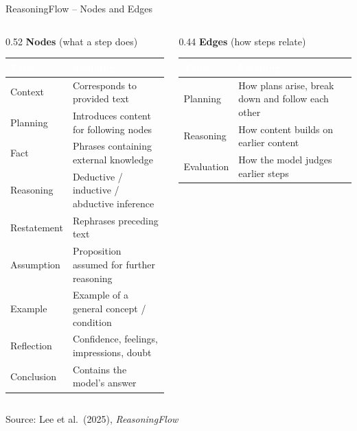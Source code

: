 \documentclass[aspectratio=169, 10pt]{beamer}
\newcommand{\hcell}[1]{\textcolor{white}{\textbf{#1}}}  %
\begin{document}
\begin{frame}{ReasoningFlow -- Nodes and Edges}
\begin{columns}[T]

\begin{column}{0.52\textwidth}
\textbf{Nodes} {\footnotesize (what a step does)}\\[0.3em]
\renewcommand{\arraystretch}{1.1}
\footnotesize
\setlength{\tabcolsep}{4pt}
\begin{tabular}{p{} p{}}
\toprule
\rowcolor{lmugreen}
\hcell{Type} & \hcell{Meaning} \\
\midrule
Context     & Corresponds to provided text \\
\rowcolor{lmulight!60}
Planning    & Introduces content for following nodes \\
Fact        & Phrases containing external knowledge \\
\rowcolor{lmulight!60}
Reasoning   & Deductive / inductive / abductive inference \\
Restatement & Rephrases preceding text \\
\rowcolor{lmulight!60}
Assumption  & Proposition assumed for further reasoning \\
Example     & Example of a general concept / condition \\
\rowcolor{lmulight!60}
Reflection  & Confidence, feelings, impressions, doubt \\
Conclusion  & Contains the model's answer \\
\bottomrule
\end{tabular}
\end{column}

\begin{column}{0.44\textwidth}
\textbf{Edges} {\footnotesize (how steps relate)}\\[0.3em]
\renewcommand{\arraystretch}{1.1}
\footnotesize
\setlength{\tabcolsep}{4pt}
\begin{tabular}{p{} p{}}
\toprule
\rowcolor{lmugreen}
\hcell{Type} & \hcell{Meaning} \\
\midrule
Planning   & How plans arise, break down and follow each other \\
\rowcolor{lmulight!60}
Reasoning  & How content builds on earlier content \\
Evaluation & How the model judges earlier steps \\
\bottomrule
\end{tabular}

\end{column}

\end{columns}
\centering
\vspace{0.6em}
{\scriptsize Source: Lee et al.\ (2025), \textit{ReasoningFlow}}
\end{frame}
\end{document}
